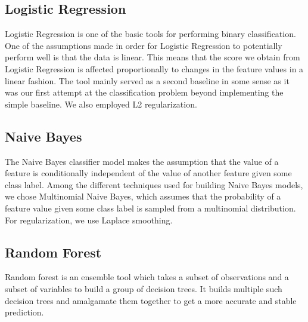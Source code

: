 \documentclass[12pt,a4paper,english]{amsart}
\begin{document}
\subsection*{Logistic Regression}

Logistic Regression is one of the basic tools for performing binary classification. One of the assumptions made in order for Logistic Regression to potentially perform well is that the data is linear. This means that the score we obtain from Logistic Regression is affected proportionally to changes in the feature values in a linear fashion. The tool mainly served as a second baseline in some sense as it was our first attempt at the classification problem beyond implementing the simple baseline. We also employed L2 regularization.

\subsection*{Naive Bayes}

The Naive Bayes classifier model makes the assumption that the value of a feature is conditionally independent of the value of another feature given some class label. Among the different techniques used for building Naive Bayes models, we chose Multinomial Naive Bayes, which assumes that the probability of a feature value given some class label is sampled from a multinomial distribution. For regularization, we use Laplace smoothing.

\subsection*{Random Forest}

Random forest is an ensemble tool which takes a subset of observations and a subset of variables to build a group of decision trees. It builds multiple such decision trees and amalgamate them together to get a more accurate and stable prediction.



\end{document}
